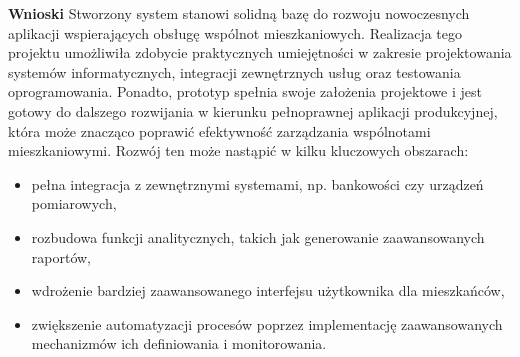 \noindent\textbf{Wnioski}\newline
Stworzony system stanowi solidną bazę do rozwoju nowoczesnych aplikacji wspierających obsługę wspólnot mieszkaniowych. Realizacja tego projektu umożliwiła zdobycie praktycznych umiejętności w zakresie projektowania systemów informatycznych, integracji zewnętrznych usług oraz testowania oprogramowania. Ponadto, prototyp spełnia swoje założenia projektowe i jest gotowy do dalszego rozwijania w kierunku pełnoprawnej aplikacji produkcyjnej, która może znacząco poprawić efektywność zarządzania wspólnotami mieszkaniowymi. Rozwój ten może nastąpić w kilku kluczowych obszarach:
\begin{itemize}
    \item pełna integracja z zewnętrznymi systemami, np. bankowości czy urządzeń pomiarowych,
    \item rozbudowa funkcji analitycznych, takich jak generowanie zaawansowanych raportów,
    \item wdrożenie bardziej zaawansowanego interfejsu użytkownika dla mieszkańców,
    \item zwiększenie automatyzacji procesów poprzez implementację zaawansowanych mechanizmów ich definiowania i monitorowania. %
\end{itemize}


